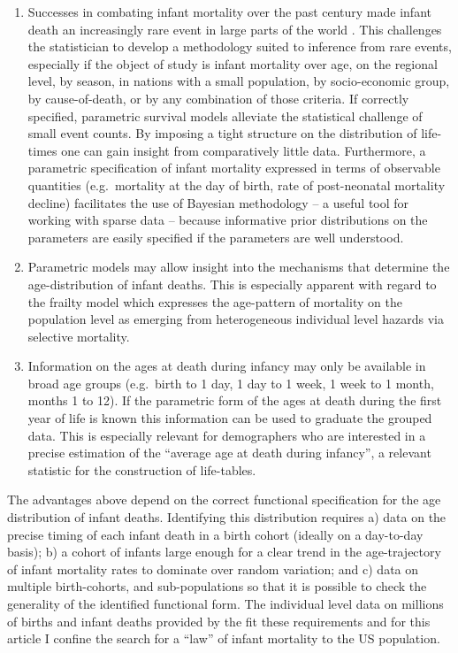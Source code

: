 \documentclass[10pt, twoside, parskip=half]{article}
\begin{document}
\begin{enumerate}
\def\labelenumi{\arabic{enumi})}
\item
  Successes in combating infant mortality over the past century made
  infant death an increasingly rare event in large parts of the world
  \citep{WHO2006, WHO2015}. This challenges the statistician to develop
  a methodology suited to inference from rare events, especially if the
  object of study is infant mortality over age, on the regional level,
  by season, in nations with a small population, by socio-economic
  group, by cause-of-death, or by any combination of those criteria. If
  correctly specified, parametric survival models alleviate the
  statistical challenge of small event counts. By imposing a tight
  structure on the distribution of life-times one can gain insight from
  comparatively little data. Furthermore, a parametric specification of
  infant mortality expressed in terms of observable quantities
  (e.g.~mortality at the day of birth, rate of post-neonatal mortality
  decline) facilitates the use of Bayesian methodology -- a useful tool
  for working with sparse data -- because informative prior
  distributions on the parameters are easily specified if the parameters
  are well understood.
\item
  Parametric models may allow insight into the mechanisms that determine
  the age-distribution of infant deaths. This is especially apparent
  with regard to the frailty model \citep{Vaupel1979} which expresses
  the age-pattern of mortality on the population level as emerging from
  heterogeneous individual level hazards via selective mortality.
\item
  Information on the ages at death during infancy may only be available
  in broad age groups (e.g.~birth to 1 day, 1 day to 1 week, 1 week to 1
  month, months 1 to 12). If the parametric form of the ages at death
  during the first year of life is known this information can be used to
  graduate the grouped data. This is especially relevant for
  demographers who are interested in a precise estimation of the
  ``average age at death during infancy'', a relevant statistic for the
  construction of life-tables.
\end{enumerate}

The advantages above depend on the correct functional specification for
the age distribution of infant deaths. Identifying this distribution
requires a) data on the precise timing of each infant death in a birth
cohort (ideally on a day-to-day basis); b) a cohort of infants large
enough for a clear trend in the age-trajectory of infant mortality rates
to dominate over random variation; and c) data on multiple
birth-cohorts, and sub-populations so that it is possible to check the
generality of the identified functional form. The individual level data
on millions of births and infant deaths provided by the \citet{NCHS2016}
fit these requirements and for this article I confine the search for a
``law'' of infant mortality to the US population.
\end{document}
